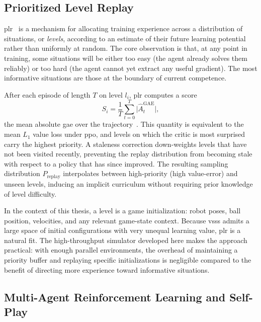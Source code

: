 \subsection{Prioritized Level Replay}

\gls{plr}~\cite{prioritized_level_replay} is a mechanism for allocating training
experience across a distribution of situations, or \emph{levels}, according to
an estimate of their future learning potential rather than uniformly at random.
The core observation is that, at any point in training, some situations will
be either too easy (the agent already solves them reliably) or too hard
(the agent cannot yet extract any useful gradient).  The most informative
situations are those at the boundary of current competence.

After each episode of length $T$ on level $l_i$, \gls{plr} computes a score
%
\begin{equation}
    S_i = \frac{1}{T}\sum_{t=0}^{T}\bigl|\hat{A}_t^{\mathrm{GAE}}\bigr|,
    \label{eq:plr_score}
\end{equation}
%
the mean absolute \gls{gae} over the trajectory~\cite{prioritized_level_replay}.  This
quantity is equivalent to the mean $L_1$ value loss under \gls{ppo}, and
levels on which the critic is most surprised carry the highest priority.  A
staleness correction down-weights levels that have not been visited recently,
preventing the replay distribution from becoming stale with respect to a
policy that has since improved.  The resulting sampling distribution
$P_{\mathrm{replay}}$ interpolates between high-priority (high value-error)
and unseen levels, inducing an implicit curriculum without requiring prior
knowledge of level difficulty.

In the context of this thesis, a level is a game initialization: robot poses,
ball position, velocities, and any relevant game-state context.  Because
\gls{vsss} admits a large space of initial configurations with very unequal
learning value, \gls{plr} is a natural fit.  The high-throughput simulator
developed here makes the approach practical: with enough parallel environments,
the overhead of maintaining a priority buffer and replaying specific
initializations is negligible compared to the benefit of directing more
experience toward informative situations.

\subsection{Multi-Agent Reinforcement Learning and Self-Play}

